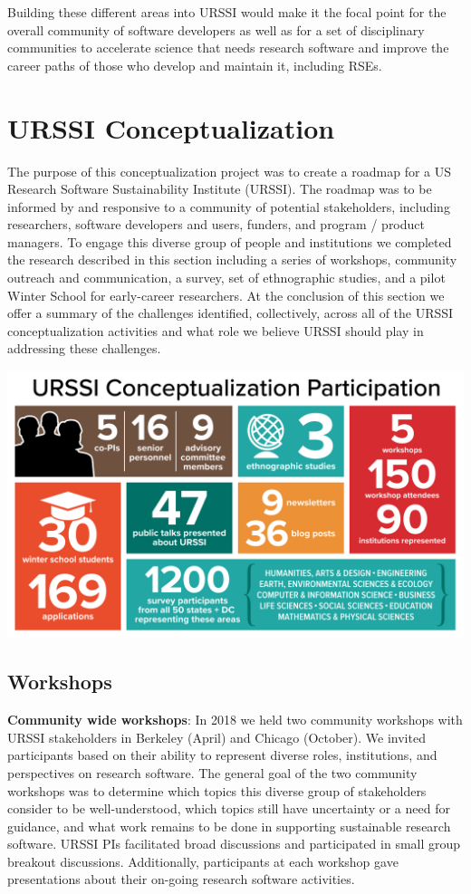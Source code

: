 \documentclass[
]{book}
\begin{document}
Building these different areas into URSSI would make it the focal point for the overall
community of software developers as well as for a set of disciplinary communities to
accelerate science that needs research software and improve the career paths of those
who develop and maintain it, including RSEs.

\hypertarget{chapter2}{%
\chapter{URSSI Conceptualization}\label{chapter2}}

The purpose of this conceptualization project was to create a roadmap for a US
Research Software Sustainability Institute (URSSI). The roadmap was to be
informed by and responsive to a community of potential stakeholders, including
researchers, software developers and users, funders, and program / product managers.
To engage this diverse group of people and institutions we completed the
research described in this section including a series of workshops, community outreach and
communication, a survey, set of ethnographic studies, and a pilot Winter School
for early-career researchers. At the conclusion of this section we offer a
summary of the challenges identified, collectively, across all of the URSSI
conceptualization activities and what role we believe URSSI should play in
addressing these challenges.

\includegraphics{images/conceptualization_activities.jpg}

\hypertarget{workshops}{%
\section{Workshops}\label{workshops}}

\textbf{Community wide workshops}: In 2018 we held two community workshops with
URSSI stakeholders in Berkeley (April) and Chicago (October). We invited participants
based on their ability to represent diverse roles, institutions, and
perspectives on research software. The general goal of the two community workshops
was to determine which topics this diverse group of stakeholders consider to be
well-understood, which topics still have uncertainty or a need for guidance, and what work
remains to be done in supporting sustainable research software. URSSI PIs
facilitated broad discussions and participated in small group breakout
discussions. Additionally, participants at each workshop gave presentations
about their on-going research software activities.
\end{document}
